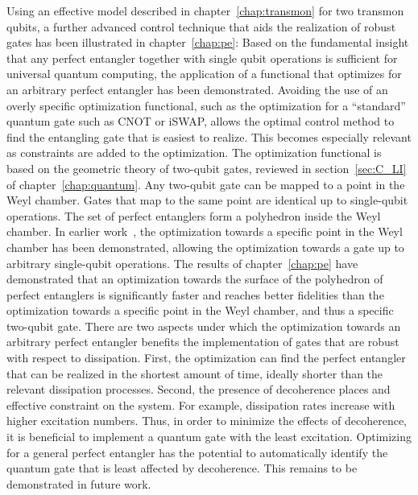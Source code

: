 Using an effective model described in chapter~\ref{chap:transmon} for two
transmon qubits, a further advanced control technique that aids the realization
of robust gates has been illustrated in chapter~\ref{chap:pe}:
Based on the fundamental insight that any perfect entangler together with single
qubit operations is sufficient for universal quantum computing, the application
of a functional that optimizes for an arbitrary perfect entangler has been
demonstrated.  Avoiding the use of an overly specific optimization functional,
such as the optimization for a ``standard'' quantum gate such as CNOT or iSWAP,
allows the optimal control method to find the entangling gate that is easiest to
realize.  This becomes especially relevant as constraints are added to the
optimization.  The optimization functional is based on the geometric theory of
two-qubit gates, reviewed in section~\ref{sec:C_LI} of
chapter~\ref{chap:quantum}. Any two-qubit gate can be mapped to a point in the
Weyl chamber. Gates that map to the same point are identical up to single-qubit
operations. The set of perfect entanglers form a polyhedron inside the Weyl
chamber.  In earlier work~\cite{ReichDipl10, MullerPRA11}, the optimization
towards a specific point in the Weyl chamber has been demonstrated, allowing the
optimization towards a gate up to arbitrary single-qubit operations. The results
of chapter~\ref{chap:pe} have demonstrated that an optimization towards the
surface of the polyhedron of perfect entanglers is significantly faster and
reaches better fidelities than the optimization towards a specific point in the
Weyl chamber, and thus a specific two-qubit gate.  There are two aspects under
which the optimization towards an arbitrary perfect entangler benefits the
implementation of gates that are robust with respect to dissipation. First, the
optimization can find the perfect entangler that can be realized in the shortest
amount of time, ideally shorter than the relevant dissipation processes. Second,
the presence of decoherence places and effective constraint on the system. For
example, dissipation rates increase with higher excitation numbers. Thus, in
order to minimize the effects of decoherence, it is beneficial to implement
a quantum gate with the least excitation. Optimizing for a general perfect
entangler has the potential to automatically identify the quantum gate that is
least affected by decoherence.  This remains to be demonstrated in future work.

